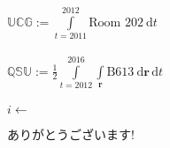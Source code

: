 \documentclass[varwidth]{standalone}
\begin{document}
    \begin{algorithmic}
    \State $\mathbb{UCG}:= \displaystyle\int\limits_{t=2011}^{2012} \textrm{Room 202}~\textrm{d}t$ \\ \\

    \State $\mathbb{QSU}:= \frac{1}{2}\displaystyle\int\limits_{t=2012}^{2016} \displaystyle\int\limits_{\mathbf{r}} \textrm{B613}~\textrm{d}\mathbf{r}\,\textrm{d}t$ \\ \\
        \State $i\gets$ \begin{CJK}{UTF8}{min}ありがとうございます!\end{CJK}
    \EndFor
    \end{algorithmic}
\end{document}
